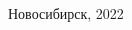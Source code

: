 \begin{titlepage}
\begin{spacing}{1}

\vfill

\begin{center}
     Новосибирск, 2022
\end{center}

\end{spacing}
\end{titlepage}

\restoregeometry
